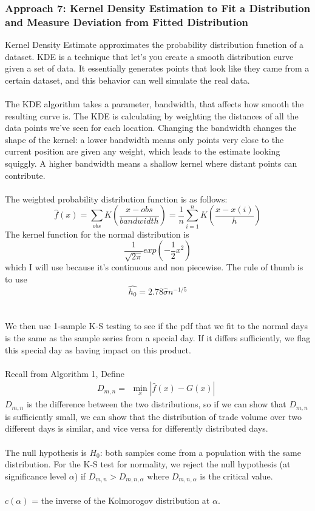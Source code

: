 \documentclass[11pt]{paper}
\begin{document}
\subsubsection*{Approach 7: Kernel Density Estimation to Fit a Distribution and Measure Deviation from Fitted Distribution}
Kernel Density Estimate approximates the probability distribution function of a dataset. KDE is a technique that let's you create a smooth distribution curve given a set of data. It essentially generates points that look like they came from a certain dataset, and this behavior can well simulate the real data.
\\\\The KDE algorithm takes a parameter, bandwidth, that affects how smooth the resulting curve is. The KDE is calculating by weighting the distances of all the data points we've seen for each location. Changing the bandwidth changes the shape of the kernel: a lower bandwidth means only points very close to the current position are given any weight, which leads to the estimate looking squiggly. A higher bandwidth means a shallow kernel where distant points can contribute.
\\\\The weighted probability distribution function is as follows:
$$\hat{f}(x) = \sum_{obs}K(\frac{x-obs}{bandwidth}) = \frac{1}{n} \sum_{i=1}^nK(\frac{x-x(i)}{h})$$
The kernel function for the normal distribution is $$\frac{1}{\sqrt{2\pi}} exp (-\frac{1}{2}x^2)$$ which I will use because it's continuous and non piecewise.
The rule of thumb is to use $$\hat{h_0} = 2.78 \hat{\sigma} n^{-1/5}$$
\\\\We then use 1-sample K-S testing to see if the pdf that we fit to the normal days is the same as the sample series from a special day. If it differs sufficiently, we flag this special day as having impact on this product.
\\\\Recall from Algorithm 1, Define
\begin{equation}D_{m,n} = 
\begin{aligned}
\min_{x} |\hat{f}(x)  - G(x)|
\end{aligned}
\end{equation}
$D_{m,n}$ is the difference between the two distributions, so if we can show that $D_{m,n}$ is sufficiently small, we can show that the distribution of trade volume over two different days is similar, and vice versa for differently distributed days. 
\\\\The null hypothesis is $H_0$: both samples come from a population with the same distribution. For the K-S test for normality, we reject the null hypothesis (at significance level $\alpha$) if $D_{m,n} > D_{m,n,\alpha}$ where $D_{m,n,\alpha}$ is the critical value. 
\\\\$c(\alpha)$ = the inverse of the Kolmorogov distribution at $\alpha$.
\end{document}

